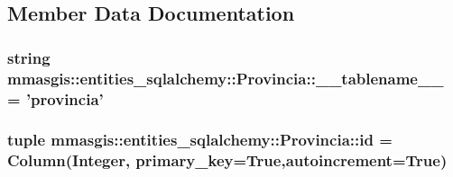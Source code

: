 \subsection{Member Data Documentation}
\hypertarget{classmmasgis_1_1entities__sqlalchemy_1_1Provincia_abb505fe49dc8c6fc954d7cf67a765a4a}{
\subsubsection[{\_\-\_\-tablename\_\-\_\-}]{\setlength{\rightskip}{0pt plus 5cm}string {\bf mmasgis::entities\_\-sqlalchemy::Provincia::\_\-\_\-tablename\_\-\_\-} = 'provincia'}}
\label{classmmasgis_1_1entities__sqlalchemy_1_1Provincia_abb505fe49dc8c6fc954d7cf67a765a4a}
\hypertarget{classmmasgis_1_1entities__sqlalchemy_1_1Provincia_aa7f40c3bba379fa8794d212d8b9afd21}{
\subsubsection[{id}]{\setlength{\rightskip}{0pt plus 5cm}tuple {\bf mmasgis::entities\_\-sqlalchemy::Provincia::id} = Column(Integer, primary\_\-key=True,autoincrement=True)}}
\label{classmmasgis_1_1entities__sqlalchemy_1_1Provincia_aa7f40c3bba379fa8794d212d8b9afd21}
\hypertarget{classmmasgis_1_1entities__sqlalchemy_1_1Provincia_ac09cbc29b113cbdcd1f619816452e073}{
\subsubsection[{nome}]{}}
\label{classmmasgis_1_1entities__sqlalchemy_1_1Provincia_ac09cbc29b113cbdcd1f619816452e073}
